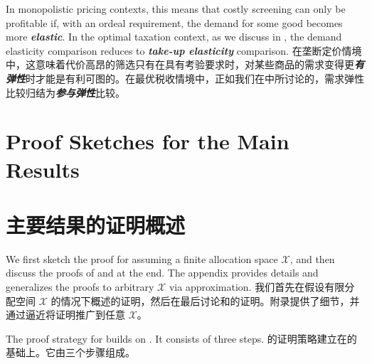 \documentclass[12pt,letterpaper]{article}
\newenvironment{original}{\color{black}\noindent}{}
\newenvironment{translation}{\color{blue}\noindent}{}
\theoremstyle{plain}
\theoremstyle{definition}
\theoremstyle{remark}
\renewcommand{\1}{\mathds{1}}
\theoremstyle{definition}
\begin{document}
\begin{original}
In monopolistic pricing contexts, this means that costly screening can only be profitable if, with an ordeal requirement, the demand for some good becomes more \textit{\textbf{elastic}}. In the optimal taxation context, as we discuss in , the demand elasticity comparison reduces to \textit{\textbf{take-up elasticity}} comparison.
\end{original}
\begin{translation}
在垄断定价情境中，这意味着代价高昂的筛选只有在具有考验要求时，对某些商品的需求变得更\textit{\textbf{有弹性}}时才能是有利可图的。在最优税收情境中，正如我们在中所讨论的，需求弹性比较归结为\textit{\textbf{参与弹性}}比较。
\end{translation}

\begin{original}
\section{Proof Sketches for the Main Results} \label{sec:proof}
\end{original}
\begin{translation}
\section{主要结果的证明概述} \label{sec:proof}
\end{translation}

\begin{original}
We first sketch the proof for  assuming a finite allocation space $\mathcal{X}$, and then discuss the proofs of  and  at the end. The appendix provides details and generalizes the proofs to arbitrary $\mathcal{X}$ via approximation.
\end{original}
\begin{translation}
我们首先在假设有限分配空间 $\mathcal{X}$ 的情况下概述的证明，然后在最后讨论和的证明。附录提供了细节，并通过逼近将证明推广到任意 $\mathcal{X}$。
\end{translation}

\begin{original}
The proof strategy for  builds on \citet{yang2022costly}. It consists of three steps.
\end{original}
\begin{translation}
的证明策略建立在\citet{yang2022costly}的基础上。它由三个步骤组成。
\end{translation}
\end{document}
